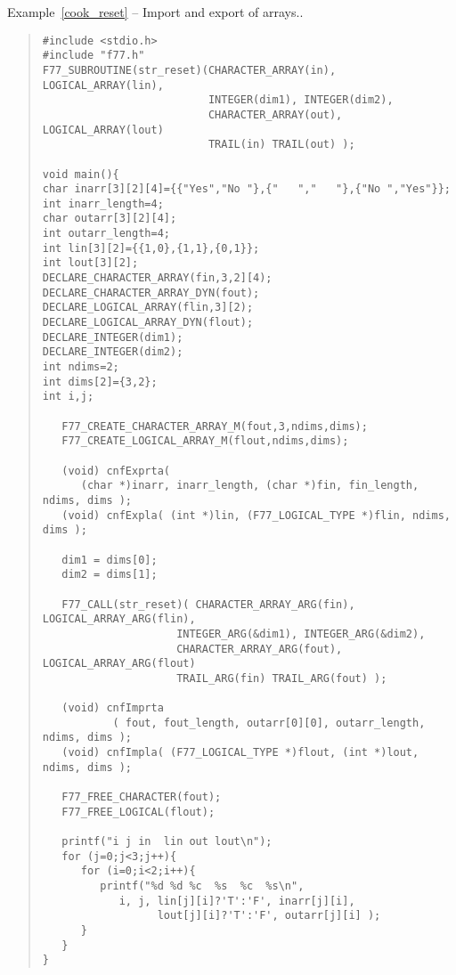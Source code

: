 \documentclass[twoside,11pt]{article}
\newcommand{\latex}[1]{#1}
\renewcommand{\_}{\texttt{\symbol{95}}}
\newcounter{examples}
\begin{document}
\label{cook_reset}
\begin{center}
Example\latex{~\ref{cook_reset}}
-- Import and export of arrays.\@.
\end{center}
{\small \begin{quote} \begin{verbatim}
#include <stdio.h>
#include "f77.h"
F77_SUBROUTINE(str_reset)(CHARACTER_ARRAY(in), LOGICAL_ARRAY(lin), 
                          INTEGER(dim1), INTEGER(dim2),
                          CHARACTER_ARRAY(out), LOGICAL_ARRAY(lout)
                          TRAIL(in) TRAIL(out) );

void main(){
char inarr[3][2][4]={{"Yes","No "},{"   ","   "},{"No ","Yes"}};
int inarr_length=4;
char outarr[3][2][4];
int outarr_length=4;
int lin[3][2]={{1,0},{1,1},{0,1}};
int lout[3][2];
DECLARE_CHARACTER_ARRAY(fin,3,2][4);
DECLARE_CHARACTER_ARRAY_DYN(fout);
DECLARE_LOGICAL_ARRAY(flin,3][2);
DECLARE_LOGICAL_ARRAY_DYN(flout);
DECLARE_INTEGER(dim1);
DECLARE_INTEGER(dim2);
int ndims=2;
int dims[2]={3,2};
int i,j;

   F77_CREATE_CHARACTER_ARRAY_M(fout,3,ndims,dims);
   F77_CREATE_LOGICAL_ARRAY_M(flout,ndims,dims);

   (void) cnfExprta( 
      (char *)inarr, inarr_length, (char *)fin, fin_length, ndims, dims );
   (void) cnfExpla( (int *)lin, (F77_LOGICAL_TYPE *)flin, ndims, dims );

   dim1 = dims[0];
   dim2 = dims[1];

   F77_CALL(str_reset)( CHARACTER_ARRAY_ARG(fin), LOGICAL_ARRAY_ARG(flin),
                     INTEGER_ARG(&dim1), INTEGER_ARG(&dim2),
                     CHARACTER_ARRAY_ARG(fout), LOGICAL_ARRAY_ARG(flout)
                     TRAIL_ARG(fin) TRAIL_ARG(fout) );

   (void) cnfImprta
           ( fout, fout_length, outarr[0][0], outarr_length, ndims, dims );
   (void) cnfImpla( (F77_LOGICAL_TYPE *)flout, (int *)lout, ndims, dims );

   F77_FREE_CHARACTER(fout);
   F77_FREE_LOGICAL(flout);

   printf("i j in  lin out lout\n");
   for (j=0;j<3;j++){
      for (i=0;i<2;i++){
         printf("%d %d %c  %s  %c  %s\n",
            i, j, lin[j][i]?'T':'F', inarr[j][i], 
                  lout[j][i]?'T':'F', outarr[j][i] );
      }
   }
}
\end{verbatim} \end{quote} }
\end{document}
